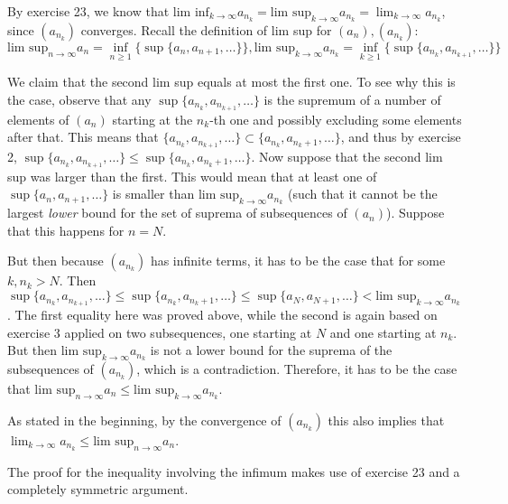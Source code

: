 \begin{solution}

    By exercise 23, we know that $\text{lim inf}_{k \rightarrow \infty} a_{n_k} = \text{lim sup}_{k \rightarrow \infty} a_{n_k} = \lim_{k \rightarrow \infty} a_{n_k}$, since $(a_{n_k})$ converges. Recall the definition of lim sup for $(a_n), (a_{n_k})$:
    $$\text{lim sup}_{n \rightarrow \infty} a_n = \inf_{n \geq 1}\{\sup\{a_n, a_{n+1}, \ldots\}\}, \text{lim sup}_{k \rightarrow \infty} a_{n_k} = \inf_{k \geq 1}\{\sup\{a_{n_k}, a_{n_{k+1}}, \ldots\}\}$$

    We claim that the second lim sup equals at most the first one. To see why this is the case, observe that any $\sup\{a_{n_k}, a_{n_{k+1}}, \ldots\}$ is the supremum of a number of elements of $(a_n)$ starting at the $n_k$-th one and possibly excluding some elements after that. This means that $\{a_{n_k}, a_{n_{k+1}}, \ldots\} \subset \{a_{n_k}, a_{n_k + 1}, \ldots \}$, and thus by exercise 2, $\sup\{a_{n_k}, a_{n_{k+1}}, \ldots\} \leq \sup\{a_{n_k}, a_{n_k + 1}, \ldots\}$. Now suppose that the second lim sup was larger than the first. This would mean that at least one of $\sup\{a_n, a_{n+1}, \ldots\}$ is smaller than $\text{lim sup}_{k \rightarrow \infty} a_{n_k}$ (such that it cannot be the largest \textit{lower} bound for the set of suprema of subsequences of $(a_n)$). Suppose that this happens for $n = N$.
    
    But then because $(a_{n_k})$ has infinite terms, it has to be the case that for some $k, n_k > N$. Then $\sup\{a_{n_k}, a_{n_{k+1}}, \ldots\} \leq \sup\{a_{n_k}, a_{n_k +1}, \ldots\} \leq \sup\{a_N, a_{N+1}, \ldots\} < \text{lim sup}_{k \rightarrow \infty} a_{n_k}$. The first equality here was proved above, while the second is again based on exercise 3 applied on two subsequences, one starting at $N$ and one starting at $n_k$. But then $\text{lim sup}_{k \rightarrow \infty} a_{n_k}$ is not a lower bound for the suprema of the subsequences of $(a_{n_k})$, which is a contradiction. Therefore, it has to be the case that $\text{lim sup}_{n \rightarrow \infty} a_n \leq \text{lim sup}_{k \rightarrow \infty} a_{n_k}$.

    As stated in the beginning, by the convergence of $(a_{n_k})$ this also implies that $\lim_{k \rightarrow \infty} a_{n_k} \leq \text{lim sup}_{n \rightarrow \infty} a_n$.

    The proof for the inequality involving the infimum makes use of exercise 23 and a completely symmetric argument.
\end{solution}

